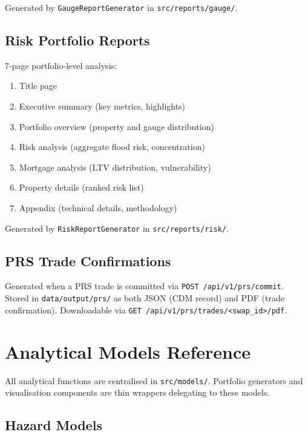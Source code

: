 \documentclass[11pt,a4paper]{article}
\begin{document}
Generated by \texttt{GaugeReportGenerator} in \texttt{src/reports/gauge/}.

\subsection{Risk Portfolio Reports}

7-page portfolio-level analysis:

\begin{enumerate}[nosep]
    \item Title page
    \item Executive summary (key metrics, highlights)
    \item Portfolio overview (property and gauge distribution)
    \item Risk analysis (aggregate flood risk, concentration)
    \item Mortgage analysis (LTV distribution, vulnerability)
    \item Property details (ranked risk list)
    \item Appendix (technical details, methodology)
\end{enumerate}

Generated by \texttt{RiskReportGenerator} in \texttt{src/reports/risk/}.

\subsection{PRS Trade Confirmations}

Generated when a PRS trade is committed via \texttt{POST /api/v1/prs/commit}.
Stored in \texttt{data/output/prs/} as both JSON (CDM record) and PDF
(trade confirmation). Downloadable via
\texttt{GET /api/v1/prs/trades/<swap\_id>/pdf}.

\section{Analytical Models Reference}

All analytical functions are centralised in \texttt{src/models/}. Portfolio
generators and visualisation components are thin wrappers delegating to these
models.

\subsection{Hazard Models}
\end{document}
